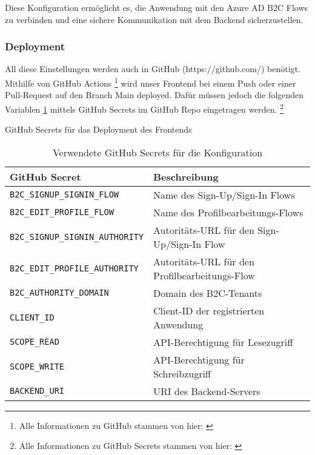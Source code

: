 Diese Konfiguration ermöglicht es, die Anwendung mit den Azure AD B2C 
Flows zu verbinden und eine sichere Kommunikation mit dem Backend sicherzustellen.

\subsubsection{Deployment}

All diese Einstellungen werden auch in GitHub (https://github.com/) benötigt.
Mithilfe von GitHub Actions \footnote{Alle Informationen zu GitHub stammen von hier: \cite{GitHuba}}
wird unser Frontend bei einem Push oder einer Pull-Request auf den Branch Main deployed.
Dafür müssen jedoch die folgenden Variablen \ref{tab:github-secrets} mittels GitHub Secrets im GitHub Repo eingetragen werden.
\footnote{Alle Informationen zu GitHub Secrets stammen von hier: \cite{GitHub}}

\begin{table}[h t]
    \centering
    \caption{GitHub Secrets für das Deployment des Frontends}
    \label{tab:github-secrets}
    \begin{tabular}{|l|l|}
    \hline
    \textbf{GitHub Secret}              & \textbf{Beschreibung} \\ \hline
    \texttt{B2C\_SIGNUP\_SIGNIN\_FLOW}   & Name des Sign-Up/Sign-In Flows \\ \hline
    \texttt{B2C\_EDIT\_PROFILE\_FLOW}    & Name des Profilbearbeitungs-Flows \\ \hline
    \texttt{B2C\_SIGNUP\_SIGNIN\_AUTHORITY} & Autoritäts-URL für den Sign-Up/Sign-In Flow \\ \hline
    \texttt{B2C\_EDIT\_PROFILE\_AUTHORITY}  & Autoritäts-URL für den Profilbearbeitungs-Flow \\ \hline
    \texttt{B2C\_AUTHORITY\_DOMAIN}      & Domain des B2C-Tenants \\ \hline
    \texttt{CLIENT\_ID}                  & Client-ID der registrierten Anwendung \\ \hline
    \texttt{SCOPE\_READ}                 & API-Berechtigung für Lesezugriff \\ \hline
    \texttt{SCOPE\_WRITE}                & API-Berechtigung für Schreibzugriff \\ \hline
    \texttt{BACKEND\_URI}                & URI des Backend-Servers \\ \hline
    \end{tabular}
    \caption{Verwendete GitHub Secrets für die Konfiguration}
\end{table}

